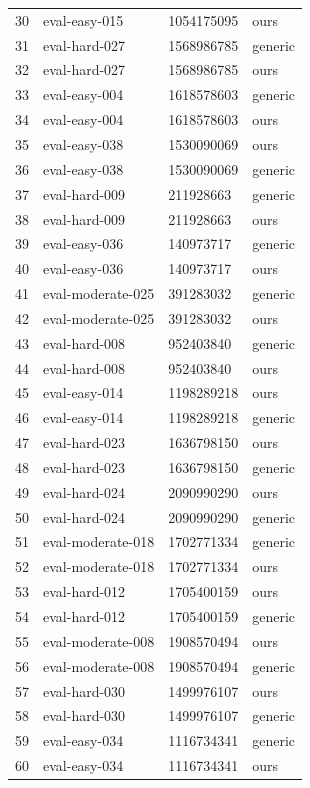 \begin{tabular}{llll}
30 & eval-easy-015 & 1054175095 & ours \\
31 & eval-hard-027 & 1568986785 & generic \\
32 & eval-hard-027 & 1568986785 & ours \\
33 & eval-easy-004 & 1618578603 & generic \\
34 & eval-easy-004 & 1618578603 & ours \\
35 & eval-easy-038 & 1530090069 & ours \\
36 & eval-easy-038 & 1530090069 & generic \\
37 & eval-hard-009 & 211928663 & generic \\
38 & eval-hard-009 & 211928663 & ours \\
39 & eval-easy-036 & 140973717 & generic \\
40 & eval-easy-036 & 140973717 & ours \\
41 & eval-moderate-025 & 391283032 & generic \\
42 & eval-moderate-025 & 391283032 & ours \\
43 & eval-hard-008 & 952403840 & generic \\
44 & eval-hard-008 & 952403840 & ours \\
45 & eval-easy-014 & 1198289218 & ours \\
46 & eval-easy-014 & 1198289218 & generic \\
47 & eval-hard-023 & 1636798150 & ours \\
48 & eval-hard-023 & 1636798150 & generic \\
49 & eval-hard-024 & 2090990290 & ours \\
50 & eval-hard-024 & 2090990290 & generic \\
51 & eval-moderate-018 & 1702771334 & generic \\
52 & eval-moderate-018 & 1702771334 & ours \\
53 & eval-hard-012 & 1705400159 & ours \\
54 & eval-hard-012 & 1705400159 & generic \\
55 & eval-moderate-008 & 1908570494 & ours \\
56 & eval-moderate-008 & 1908570494 & generic \\
57 & eval-hard-030 & 1499976107 & ours \\
58 & eval-hard-030 & 1499976107 & generic \\
59 & eval-easy-034 & 1116734341 & generic \\
60 & eval-easy-034 & 1116734341 & ours \\

\end{tabular}

